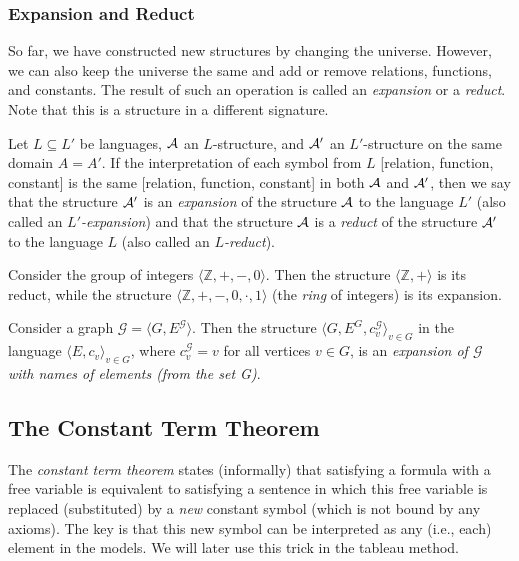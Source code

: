 \subsubsection{Expansion and Reduct}

So far, we have constructed new structures by changing the universe. However, we can also keep the universe the same and add or remove relations, functions, and constants. The result of such an operation is called an \emph{expansion} or a \emph{reduct}. Note that this is a structure in a different signature.

\begin{definition}
    Let $L\subseteq L'$ be languages, $\mathcal{A}$ an $L$-structure, and $\mathcal{A}'$ an $L'$-structure on the same domain $A=A'$. If the interpretation of each symbol from $L$ [relation, function, constant] is the same [relation, function, constant] in both $\mathcal{A}$ and $\mathcal{A}'$, then we say that the structure $\mathcal{A}'$ is an \emph{expansion} of the structure $\mathcal{A}$ to the language $L'$ (also called an \emph{$L'$-expansion}) and that the structure $\mathcal{A}$ is a \emph{reduct} of the structure $\mathcal{A}'$ to the language $L$ (also called an \emph{$L$-reduct}).    
\end{definition}

\begin{example}
    Consider the group of integers $\langle\mathbb Z,+,-,0\rangle$. Then the structure $\langle \mathbb Z,+\rangle$ is its reduct, while the structure $\langle\mathbb Z,+,-,0,\cdot,1\rangle$ (the \emph{ring} of integers) is its expansion.
\end{example}

\begin{example}
    Consider a graph $\mathcal G=\langle G, E^\mathcal G\rangle$. Then the structure $\langle G, E^G,c_v^\mathcal G\rangle_{v\in G}$ in the language $\langle E,c_v\rangle_{v\in G}$, where $c_v^\mathcal G=v$ for all vertices $v\in G$, is an \emph{expansion of $\mathcal G$ with names of elements (from the set G)}.
\end{example}


\subsection{The Constant Term Theorem}

The \emph{constant term theorem} states (informally) that satisfying a formula with a free variable is equivalent to satisfying a sentence in which this free variable is replaced (substituted) by a \emph{new} constant symbol (which is not bound by any axioms). The key is that this new symbol can be interpreted as any (i.e., each) element in the models. We will later use this trick in the tableau method.

